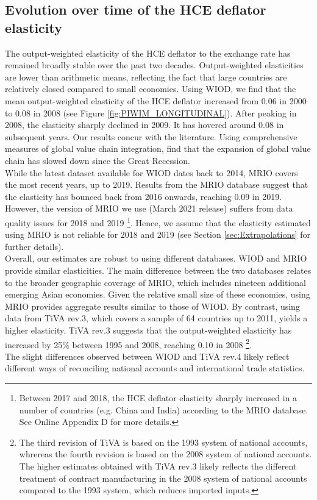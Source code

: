 \documentclass[11pt,a4paper]{paper} %
\begin{document}
\subsection{Evolution over time of the HCE deflator elasticity}\label{subsec:timeevol}
The output-weighted elasticity of the HCE deflator to the exchange rate has remained broadly stable over the past two decades.
Output-weighted elasticities are lower than arithmetic means, reflecting the fact that large countries are relatively closed compared to small economies.
Using WIOD, we find that the mean output-weighted elasticity of the HCE deflator increased from 0.06 in 2000 to 0.08 in 2008 (see Figure \ref{fig:PIWIM_LONGITUDINAL}). 
After peaking in 2008, the elasticity sharply declined in 2009. It has hovered around 0.08 in subsequent years. 
Our results concur with the literature.
Using comprehensive measures of global value chain integration, \cite{Timmer2016} find that the expansion of global value chain has slowed down since the Great Recession.\\
While the latest dataset available for WIOD dates back to 2014, MRIO covers the most recent years, up to 2019. 
Results from the MRIO database suggest that the elasticity has bounced back from 2016 onwards, reaching 0.09 in 2019.
However, the version of MRIO we use (March 2021 release) suffers from data quality issues for 2018 and 2019 \footnote{Between 2017 and 2018, the HCE deflator elasticity sharply increased in a number of countries (e.g. China and India) according to the MRIO database. See Online Appendix D for more details.}. 
Hence, we assume that the elasticity estimated using MRIO is not reliable for 2018 and 2019 (see Section \ref{sec:Extrapolations} for further details).\\
Overall, our estimates are robust to using different databases.
WIOD and MRIO provide similar elasticities. 
The main difference between the two databases relates to the broader geographic coverage of MRIO, which includes nineteen additional emerging Asian economies. 
Given the relative small size of these economies, using MRIO provides aggregate results similar to those of WIOD.
By contrast, using data from TiVA rev.3, which covers a sample of 64 countries up to 2011, yields a higher elasticity. 
TiVA rev.3 suggests that the output-weighted elasticity has increased by 25\% between 1995 and 2008, reaching 0.10 in 2008 \footnote{The third revision of TiVA is based on the 1993 system of national accounts, whrereas the fourth revision is based on the 2008 system of national accounts. The higher estimates obtained with TiVA rev.3 likely reflects the different treatment of contract manufacturing in the 2008 system of national accounts compared to the 1993 system, which reduces imported inputs.}. \\
The slight differences observed between WIOD and TiVA rev.4 likely reflect different ways of reconciling national accounts and international trade statistics.
\end{document}
